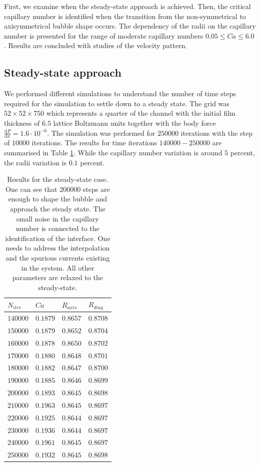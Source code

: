 \documentclass[preprint,12pt]{elsarticle}
\begin{document}
First, we examine when the steady-state approach is
achieved. Then, the critical capillary number is identified when the transition from the
non-symmetrical to axisymmetrical bubble shape occurs. The dependency of the radii on the capillary
number is presented for the range of moderate capillary numbers $0.05 \leq Ca \leq 6.0$. Results are
concluded with studies of the velocity pattern.

\subsection{Steady-state approach}
\label{sec:steady:state}
We performed different simulations to understand the number of time steps required for the
simulation to
settle down to a steady state. The grid  was $52 \times 52 \times 750$ which represents
a quarter of the channel with the initial film thickness of $6.5$ lattice Boltzmann units together
with the body force $\frac{\mathrm{d}P}{\mathrm{d}x}=1.6
\cdot 10^{-6}$. The simulation was performed for $250000$ iterations with the step of
$10000$ iterations. The results for time iterations $140000-250000$ are summarised in Table
\ref{table:steady:state}. While the
capillary number variation is around $5$ percent, the radii variation is $0.1$ percent. 
\begin{table}
\begin{tabularx}{\textwidth}{|X|X|X|X|}
\hline
$N_{iter}$&$Ca$&$R_{axis}$&$R_{diag}$\\
\hline
$140000$&$0.1879$&$0.8657$&$0.8708$\\
$150000$&$0.1879$&$0.8652$&$0.8704$\\
$160000$&$0.1878$&$0.8650$&$0.8702$\\
$170000$&$0.1880$&$0.8648$&$0.8701$\\
$180000$&$0.1882$&$0.8647$&$0.8700$\\
$190000$&$0.1885$&$0.8646$&$0.8699$\\
$200000$&$0.1893$&$0.8645$&$0.8698$\\
$210000$&$0.1963$&$0.8645$&$0.8697$\\
$220000$&$0.1925$&$0.8644$&$0.8697$\\
$230000$&$0.1936$&$0.8644$&$0.8697$\\
$240000$&$0.1961$&$0.8645$&$0.8697$\\
$250000$&$0.1932$&$0.8645$&$0.8698$\\
\hline
\end{tabularx}
\caption{Results for the steady-state case. One
can see that $200000$ steps are enough to shape
the bubble and approach the steady state. The small noise in the capillary number is connected to
the identification of the interface. One needs to address the interpolation and the spurious
currents existing in the system. All other parameters are relaxed to the
steady-state.\label{table:steady:state}}
\end{table}
\end{document}
